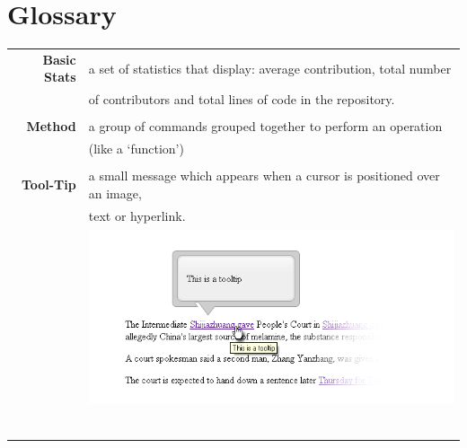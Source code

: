 \documentclass[12pt]{article}
\begin{document}
\part*{Glossary}
\begin{table}[!htb]
\begin{tabular}{rl}
\noindent \textbf{Basic Stats} &  a set of statistics that display: average contribution, total number \\ 
& of contributors and total lines of code in the repository.\\

& \\

\noindent \textbf{Method}    & a group of commands grouped together to perform an operation \\
& (like a `function')\\

& \\                             

\noindent \textbf{Tool-Tip} & a small message which appears when a cursor is positioned over an image,\\
                             &  text or hyperlink.\\
                             & \hfill \includegraphics[scale=0.7]{tooltip}\\
                             & \\
                             & \\
                             & \\
                             & \\
                             & \\
                             & \\
\end{tabular}
\end{table}
\end{document}
